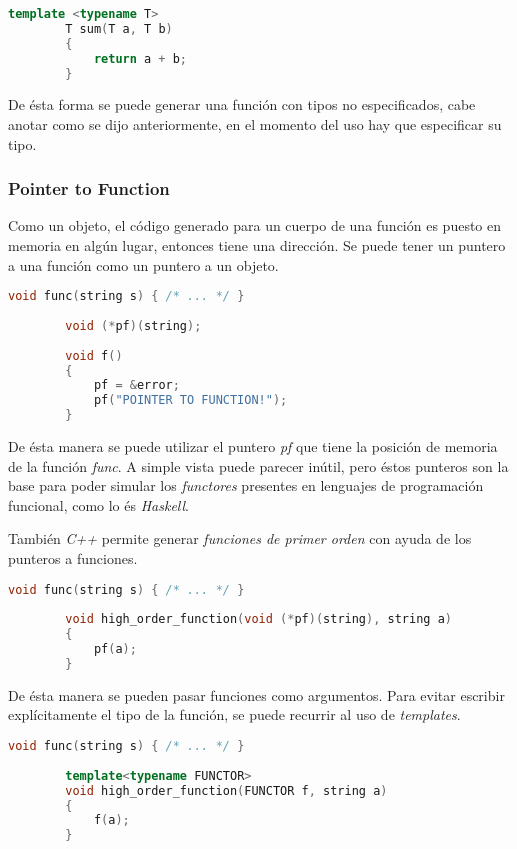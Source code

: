 		\begin{lstlisting}[language=C++, caption="Función que suma dos variables de tipo T"]
		template <typename T>
		T sum(T a, T b)
		{
			return a + b;
		}
		\end{lstlisting}
		
		De ésta forma se puede generar una función con tipos no especificados, cabe anotar como se dijo anteriormente, en el momento del uso hay que especificar su tipo.
	
	\subsubsection{Pointer to Function}
		Como un objeto, el código generado para un cuerpo de una función es puesto en memoria en algún lugar, entonces tiene una dirección. Se puede tener un puntero a una función como un puntero a un objeto. \cite{Bjarne}
		
		\begin{lstlisting}[language=C++, caption="Puntero a una función"]
		void func(string s) { /* ... */ }
		
		void (*pf)(string);
		
		void f()
		{
			pf = &error;
			pf("POINTER TO FUNCTION!");
		}
		\end{lstlisting}
		
		De ésta manera se puede utilizar el puntero \emph{pf} que tiene la posición de memoria de la función \emph{func}. A simple vista puede parecer inútil, pero éstos punteros son la base para poder simular los \emph{functores} presentes en lenguajes de programación funcional, como lo és \emph{Haskell}.
		
		También \emph{C++} permite generar \emph{funciones de primer orden} con ayuda de los punteros a funciones.
		
		\begin{lstlisting}[language=C++, caption="Funciones de primer orden"]
		void func(string s) { /* ... */ }
		
		void high_order_function(void (*pf)(string), string a)
		{
			pf(a);
		}
		\end{lstlisting}
		
		De ésta manera se pueden pasar funciones como argumentos. Para evitar escribir explícitamente el tipo de la función, se puede recurrir al uso de \emph{templates}.
		
		\begin{lstlisting}[language=C++, caption="Funciones de primer orden con templates"]
		void func(string s) { /* ... */ }
		
		template<typename FUNCTOR>
		void high_order_function(FUNCTOR f, string a)
		{ 
			f(a);
		}
		\end{lstlisting}
		
